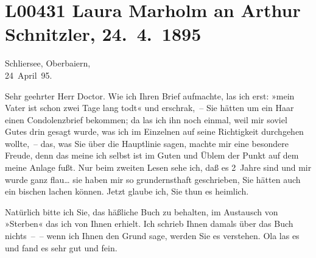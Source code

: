 

\section[Laura Marholm an Arthur Schnitzler, 24. 4. 1895]{L00431 Laura Marholm an Arthur Schnitzler, 24. 4. 1895}
\nopagebreak{}
\rehead{ }\normalsize\beginnumbering{}
\toendnotes[C]{\smallbreak\pagebreak[2]}
\toendnotes[C]{\smallbreak}
\pstart
           \raggedleft{}{\pb}Schliersee, Oberbaiern,{\\}24 April 95.\pend
           
\pstart{}Sehr geehrter Herr Doctor.\pend\vspace{0.5em}
\pstart
           Wie ich Ihren Brief aufmachte, las ich erst: »mein Vater ist schon zwei Tage lang todt« und erschrak, – Sie
               hätten um ein Haar einen Condolenzbrief bekommen; da las ich ihn noch einmal, weil
               mir soviel Gutes drin gesagt wurde, was ich im Einzelnen auf seine Richtigkeit
               durchgehen wollte, – das, was Sie über die Hauptlinie sagen, machte mir eine
               besondere Freude, denn das meine ich selbst ist im Guten und Üblem der Punkt auf dem
               meine Anlage fußt. Nur beim zweiten Lesen sehe ich, daß es 2 Jahre sind und mir wurde
               ganz flau{\dots} sie haben mir so grundernsthaft geschrieben,
               Sie hätten auch ein bischen lachen können. Jetzt glaube ich, Sie thun es
               heimlich.\pend
           
\pstart
           Natürlich bitte ich Sie, das häßliche Buch zu behalten, im Austausch von »Sterben« {\pb}das ich von Ihnen
               erhielt. Ich schrieb Ihnen damals über das Buch nichts – – wenn ich Ihnen den Grund
               sage, werden Sie es verstehen. Ola las es und
               fand es sehr gut und fein.\pend
           
